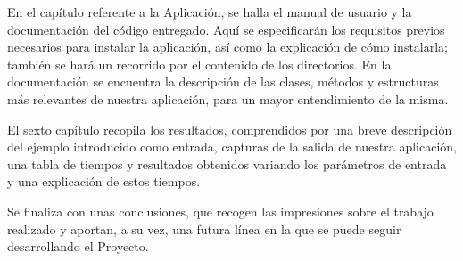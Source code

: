 En el capítulo referente a la Aplicación, se halla el manual de usuario y la
documentación del código entregado. Aquí se especificarán los requisitos previos
necesarios para instalar la aplicación, así como la explicación
de cómo instalarla; también se hará un recorrido por el contenido de los
directorios. En la documentación se encuentra la descripción de las clases,
métodos y estructuras más relevantes de nuestra aplicación, para un mayor
entendimiento de la misma.

El sexto capítulo recopila los resultados, comprendidos por una breve
descripción del ejemplo introducido como entrada, capturas de la salida de
nuestra aplicación, una tabla de tiempos y resultados obtenidos variando los
parámetros de entrada y una explicación de estos tiempos.

Se finaliza con unas conclusiones, que recogen las impresiones sobre el trabajo
realizado y aportan, a su vez, una futura línea en la que se puede seguir
desarrollando el Proyecto.
